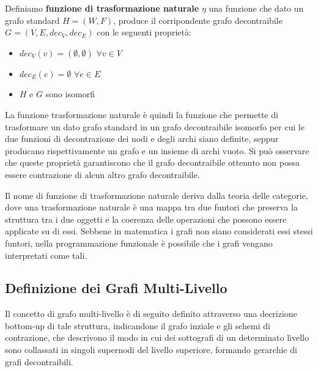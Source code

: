     \begin{definition}  \newline
    Definiamo \textbf{funzione di trasformazione naturale} $\eta$ una funzione che dato un grafo standard
        $H=(W,F)$, produce il corripondente grafo decontraibile $G = (V, E, dec_V, dec_E)$ con le seguenti propriet\`a:
        \begin{itemize}
            \item $dec_V(v) = (\emptyset, \emptyset)$ \quad $\forall v\in V$
            \item $dec_E(e) = \emptyset$ \quad $\forall e\in E$
            \item $H$ e $G$ sono isomorfi
        \end{itemize}
    \end{definition}

    La funzione trasformazione naturale \`e quindi la funzione che permette di trasformare un dato grafo standard in un
    grafo decontraibile isomorfo per cui le due funzioni di decontrazione dei nodi e degli archi siano definite,
    seppur producano rispettivamente un grafo e un insieme di archi vuoto. \newline
    Si pu\`o osservare che queste propriet\`a garantiscono che il grafo decontraibile ottenuto non possa essere
    contrazione di alcun altro grafo decontraibile. \newline

    Il nome di funzione di trasformazione naturale deriva dalla teoria delle categorie, dove una trasformazione
    naturale \`e una mappa tra due funtori che preserva la struttura tra i due oggetti e la coerenza delle operazioni
    che possono essere applicate su di essi. Sebbene in matematica i grafi non siano considerati essi stessi funtori,
    nella programmazione funzionale \`e possibile che i grafi vengano interpretati come tali. \newline

    \subsection{Definizione dei Grafi Multi-Livello}\label{subsec:definzione-grafi_multilivello}

    Il concetto di grafo multi-livello \`e di seguito definito attraverso una decrizione bottom-up di tale struttura,
    indicandone il grafo inziale e gli schemi di contrazione, che descrivono il modo in cui dei sottografi di un
    determinato livello sono collassati in singoli supernodi del livello superiore, formando gerarchie di grafi
    decontraibili.

